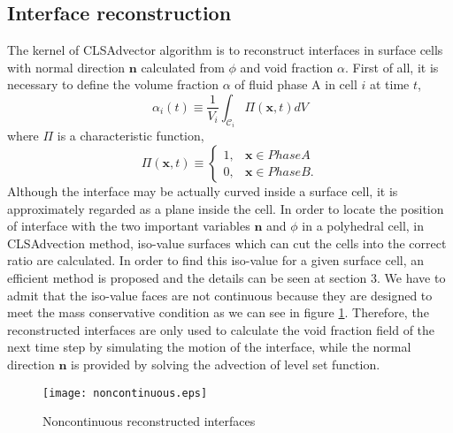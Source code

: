 \subsection{Interface reconstruction}
The kernel of CLSAdvector algorithm is to reconstruct interfaces in surface cells with normal direction $\mathbf{n}$ calculated from $\phi$ and void fraction $\alpha$. First of all, it is necessary to define the volume fraction $\alpha$ of fluid phase A in cell $i$ at time $t$,
\begin{equation}\label{18}
\alpha_i(t)\equiv\frac{1}{V_i}\int_{\mathscr{C}_i}\Pi(\mathbf{x},t)dV
\end{equation}
where $\Pi$ is a characteristic function,
\begin{equation}\label{19}
\Pi(\mathbf{x},t)\equiv\left\{
\begin{array}{lr}
1,&\mathbf{x}\in Phase A \\
0,&\mathbf{x}\in Phase B.
\end{array}\right.
\end{equation}
Although the interface may be actually curved inside a surface cell, it is approximately regarded as a plane inside the cell. In order to locate the position of interface with the two important variables $\mathbf{n}$ and $\phi$ in a polyhedral cell, in CLSAdvection method, iso-value surfaces which can cut the cells into the correct ratio are calculated. In order to find this iso-value for a given surface cell, an efficient method is proposed and the details can be seen at section 3. We have to admit that the iso-value faces are not continuous because they are designed to meet the mass conservative condition as we can see in figure \ref{fig:noncontinuous}. Therefore, the reconstructed interfaces are only used to calculate the void fraction field of the next time step by simulating the motion of the interface, while the normal direction $\mathbf{n}$ is provided by solving the advection of level set function.

\begin{figure}[htbp]
\centering
\texttt{[image: noncontinuous.eps]}
\caption{Noncontinuous reconstructed interfaces}
\label{fig:noncontinuous}
\end{figure}


